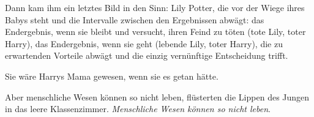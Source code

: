 Dann kam ihm ein letztes Bild in den Sinn: Lily Potter, die vor der Wiege ihres
Babys steht und die Intervalle zwischen den Ergebnissen abwägt: das Endergebnis,
wenn sie bleibt und versucht, ihren Feind zu töten (tote Lily, toter Harry), das
Endergebnis, wenn sie geht (lebende Lily, toter Harry), die zu erwartenden
Vorteile abwägt und die einzig vernünftige Entscheidung trifft.

Sie wäre Harrys Mama gewesen, wenn sie es getan hätte.

\glqq{}Aber menschliche Wesen können so nicht leben\grqq{}, flüsterten die Lippen
des Jungen in das leere Klassenzimmer. \glqq{}\emph{Menschliche Wesen können so
nicht leben}.\grqq{}

